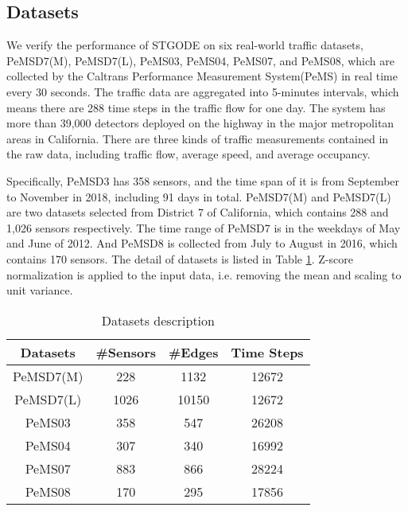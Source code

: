 \documentclass[sigconf]{acmart}
\theoremstyle{definition}
\begin{document}
\subsection{Datasets}
We verify the performance of STGODE on six real-world traffic datasets, PeMSD7(M), PeMSD7(L), PeMS03, PeMS04, PeMS07, and PeMS08, which are collected by the Caltrans Performance Measurement System(PeMS) in real time every 30 seconds\cite{chen2001freeway}. The traffic data are aggregated into 5-minutes intervals, which means there are 288 time steps in the traffic flow for one day. The system has more than 39,000 detectors deployed on the highway in the major metropolitan areas in California. There are three kinds of traffic measurements contained in the raw data, including traffic flow, average speed, and average occupancy.

Specifically, PeMSD3 has 358 sensors, and the time span of it is from September to November in 2018, including 91 days in total. PeMSD7(M) and PeMSD7(L) are two datasets selected from District 7 of California, which contains 288 and 1,026 sensors respectively. The time range of PeMSD7 is in the weekdays of May and June of 2012. And PeMSD8 is collected from July to August in 2016, which contains 170 sensors. The detail of datasets is listed in Table \ref{tab:dataset}. Z-score normalization is applied to the input data, i.e. removing the mean and scaling to unit variance.
\begin{table}[htbp]
  \centering
    \begin{tabular}{cccc}
    \hline
    Datasets & \#Sensors & \#Edges & Time Steps  \\ \hline
    PeMSD7(M) & 228  &1132  & 12672 \\
    PeMSD7(L) & 1026 &10150 & 12672 \\
    PeMS03    & 358  &547   & 26208 \\
    PeMS04    & 307  &340   & 16992 \\
    PeMS07    & 883  &866   & 28224 \\
    PeMS08    & 170  &295   & 17856 \\ \hline
    \end{tabular}\caption{Datasets description}
  \label{tab:dataset}\end{table}
\end{document}
